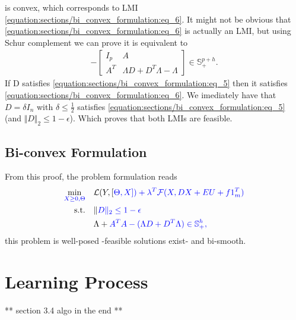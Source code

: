 \documentclass[letterpaper,10pt,english]{sphinxmanual}
\begin{document}
is convex, which corresponds to LMI \eqref{equation:sections/bi_convex_formulation:eq_6}. It might not be obvious that \eqref{equation:sections/bi_convex_formulation:eq_6} is actually an LMI, but using
Schur complement we can prove it is equivalent to
\begin{equation*}
\begin{split}- \begin{bmatrix}
        I_p & A \\
        A^T & \Lambda D + D^T \Lambda - \Lambda
    \end{bmatrix}
    \in \mathbb{S}_+^{p + h}.\end{split}
\end{equation*}
If D satisfies \eqref{equation:sections/bi_convex_formulation:eq_5} then it satisfies \eqref{equation:sections/bi_convex_formulation:eq_6}. We imediately have that \(D = \delta I_n\) with \(\delta \leq \frac{1}{2}\) satisfies \eqref{equation:sections/bi_convex_formulation:eq_5}
(and \(\Vert D \Vert_2 \leq 1 - \epsilon\)). Which proves that both LMIs are feasible.


\section{Bi-convex Formulation}
\label{\detokenize{sections/bi_convex_formulation:bi-convex-formulation}}
From this proof, the problem formulation reads
\begin{equation}\label{equation:sections/bi_convex_formulation:eq_7}
\begin{split}\begin{align}
    \min_{\color{blue}{X} \geq 0, \color{blue}{\Theta}} \quad &\mathcal{L}(Y,[\color{blue}{\Theta},\color{blue}{X}]) + \lambda^T \mathcal{F}(\color{blue}{X},\color{blue}{DX} + \color{blue}{E}U + \color{blue}{f}1_m^T) \\
    \text{s.t.} \quad &\Vert \color{blue}{D} \Vert_2 \leq 1 - \epsilon \\
                \quad &\Lambda + \color{blue}{A}^T\color{blue}{A} - (\Lambda \color{blue}{D} + \color{blue}{D}^T \Lambda) \in \mathbb{S}_+^h,
\end{align}\end{split}
\end{equation}
this problem is well-posed -feasible solutions exist- and bi-smooth.


\chapter{Learning Process}
\label{\detokenize{sections/learning:learning-process}}\label{\detokenize{sections/learning:learning}}\label{\detokenize{sections/learning::doc}}
** section 3.4 algo in the end **
\end{document}
